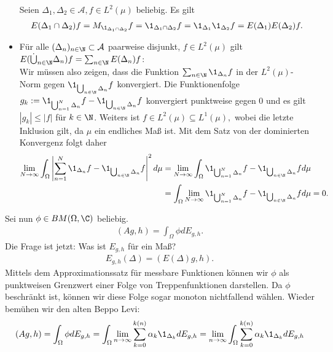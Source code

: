 \begin{solution}
\begin{itemize}
  Seien $\Delta_1,\Delta_2 \in \mathcal{A}, f \in L^2(\mu)$ beliebig. Es gilt
  \begin{align*}
    E(\Delta_1 \cap \Delta_2)f = M_{\1_{\Delta_1 \cap \Delta_2}}f
    = \1_{\Delta_1 \cap \Delta_2}f = \1_{\Delta_1}\1_{\Delta_2}f
    = E(\Delta_1)E(\Delta_2)f.
  \end{align*}
  \item Für alle $(\Delta_n)_{n \in \N} \subset \mathcal{A}$ paarweise disjunkt, $f \in L^2(\mu)$ gilt $E(\dot\bigcup_{n \in \N}\Delta_n)f = \sum_{n \in \N}E(\Delta_n)f$: \\
  Wir müssen also zeigen, dass die Funktion $\sum_{n \in \N}\1_{\Delta_n}f$
  in der $L^2(\mu)$-Norm gegen $\1_{\bigcup_{n \in \N}\Delta_n}f$ konvergiert.
  Die Funktionenfolge $g_k := \1_{\bigcup_{n = 1}^N\Delta_n}f -
  \1_{\bigcup_{n \in \N}\Delta_n}f$ konvergiert punktweise gegen $0$ und es gilt $|g_k| \leq |f|$ für $k \in \N$. Weiters ist $f \in L^2(\mu) \subseteq L^1(\mu),$ wobei die letzte Inklusion gilt, da $\mu$ ein endliches Maß ist.
  Mit dem Satz von der dominierten Konvergenz folgt daher
  \begin{align*}
  \lim_{N \to \infty}\int_\Omega \left|\sum_{n = 1}^N\1_{\Delta_n}f - \1_{\bigcup_{n \in \N}\Delta_n}f\right|^2 d\mu
  &= \lim_{N \to \infty}\int_\Omega \1_{\bigcup_{n = 1}^N\Delta_n}f -
  \1_{\bigcup_{n \in \N}\Delta_n}f
   d\mu \\
  &= \int_\Omega \lim_{N \to \infty} \1_{\bigcup_{n = 1}^N\Delta_n}f -
  \1_{\bigcup_{n \in \N}\Delta_n}f d\mu = 0.
  \end{align*}
\end{itemize}
Sei nun $\phi \in BM(\Omega,\C)$ beliebig.
\begin{align*}
  (Ag,h) = \int_{\Omega}\phi dE_{g,h}.
\end{align*}
Die Frage ist jetzt: Was ist $E_{g,h}$ für ein Maß?
\begin{align*}
  E_{g,h}(\Delta) = (E(\Delta)g,h).
\end{align*}
Mittels dem Approximationssatz für messbare Funktionen können wir $\phi$
als punktweisen Grenzwert einer Folge von Treppenfunktionen darstellen.
Da $\phi$ beschränkt ist, können wir diese Folge sogar monoton nichtfallend wählen.
Wieder bemühen wir den alten Beppo Levi:
\begin{align*}
  (Ag,h) &= \int_{\Omega}\phi dE_{g,h} = \int_{\Omega}\lim_{n \to \infty}
  \sum_{k=0}^{k(n)}\alpha_k\1_{\Delta_k} dE_{g,h}
  = \lim_{n \to \infty}\int_{\Omega}\sum_{k=0}^{k(n)}\alpha_k\1_{\Delta_k} dE_{g,h} \\

\end{align*}
\end{solution}
